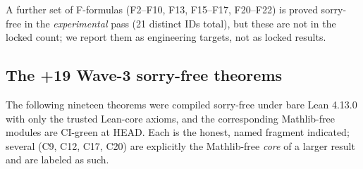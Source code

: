 \documentclass[11pt]{article}
\theoremstyle{plain}
\theoremstyle{definition}
\theoremstyle{remark}
\begin{document}
A further set of F-formulas (F2--F10, F13, F15--F17, F20--F22) is proved sorry-free
in the \emph{experimental} pass (21 distinct IDs total), but these are not in the
locked count; we report them as engineering targets, not as locked results.

\subsection{The +19 Wave-3 sorry-free theorems}
\label{sec:wave3theorems}
The following nineteen theorems were compiled sorry-free under bare Lean 4.13.0 with
only the trusted Lean-core axioms, and the corresponding Mathlib-free modules are
CI-green at HEAD. Each is the honest, named fragment indicated; several (C9, C12,
C17, C20) are explicitly the Mathlib-free \emph{core} of a larger result and are
labeled as such.
\end{document}
